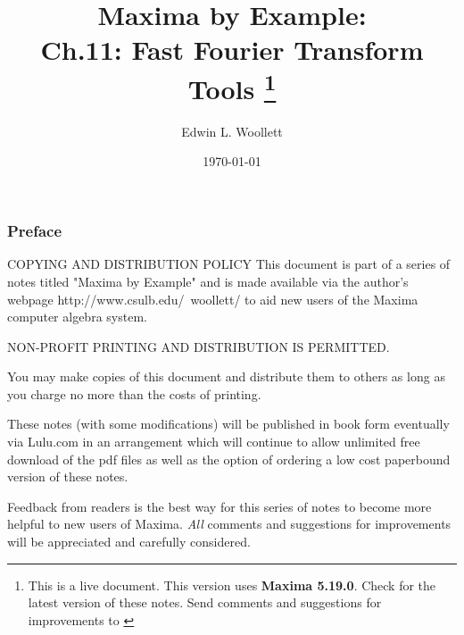 \documentclass[11pt]{article}
\title{ Maxima by Example:\\ Ch.11: Fast Fourier Transform Tools
            \thanks{This is a live document. This version uses \textbf{Maxima 5.19.0}.
			 Check \; \textbf{ \tedhome } \; for the latest version of these notes. Send comments and
			 suggestions for improvements to \textbf{\tedmail} } }
\author{Edwin L. Woollett}
\date{\today}
\newcommand{\tcdb}{\textcolor{mdb}}
\newcommand{\tcbr}{\textcolor{BrickRed}}
\begin{document}
%
\maketitle
\tableofcontents
{}
\newpage
\subsubsection*{Preface}
\begin{myVerbatim2s} 
COPYING AND DISTRIBUTION POLICY    
This document is part of a series of notes titled
"Maxima by Example" and is made available
via the author's webpage http://www.csulb.edu/~woollett/
to aid new users of the Maxima computer algebra system.	
	
NON-PROFIT PRINTING AND DISTRIBUTION IS PERMITTED.
	
You may make copies of this document and distribute them
to others as long as you charge no more than the costs of printing.	

These notes (with some modifications) will be published in book form
eventually via Lulu.com in an arrangement which will continue
to allow unlimited free download of the pdf files as well as the option
of ordering a low cost paperbound version of these notes.
\end{myVerbatim2s}	
\smallskip
\noindent \tcbr{Feedback from readers is the best way for this series of notes
  to become more helpful to new users of Maxima}.
\tcdb{\emph{All} comments and suggestions for improvements will be appreciated and
  carefully considered}.
\smallskip
{} 
\end{document}
